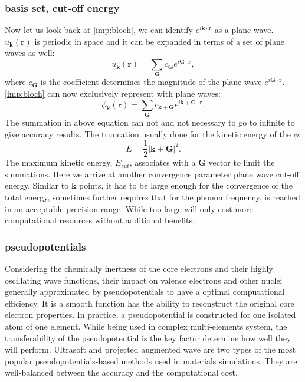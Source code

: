 \subsubsection{basis set, cut-off energy }
Now let us look back at \autoref{imp:bloch}, we can identify $e^{i\mathbf{k}\cdot\mathbf{r}}$ as a plane wave. $u_{\mathbf{k}}(\mathbf{r})$ is periodic in space and it can be expanded in terms of a set of plane waves as well:
\begin{equation}
u_{\mathbf{k}}(\mathbf{r})=\sum_{\mathbf{G}}c_{\mathbf{G}}e^{i\mathbf{G}\cdot\mathbf{r}},
\end{equation}
where $c_{\mathbf{G}}$ is the coefficient determines the magnitude of the plane wave $e^{i\mathbf{G}\cdot\mathbf{r}}$. \autoref{imp:bloch} can now exclusively represent with plane waves:
\begin{equation}
\phi_{\mathbf{k}}(\mathbf{r})=\sum_{\mathbf{G}}c_{\mathbf{k+G}}e^{i\mathbf{k+G}\cdot\mathbf{r}}.
\end{equation}
The summation in above equation can not and not necessary to go to infinite to give accuracy results. The truncation usually done for the kinetic energy of the $\phi$:
\begin{equation}
E=\frac{1}{2}|\mathbf{k+G}|^2.
\end{equation}
The maximum kinetic energy, $E_{cut}$, associates with a $\mathbf{G}$ vector to limit the summations. Here we arrive at another convergence parameter plane wave cut-off energy. Similar to $\mathbf{k}$ points, it has to be large enough for the convergence of the total energy, sometimes further requires that for the phonon frequency, is reached in an acceptable precision range.  While too large will only cost more computational resources without additional benefits.
\subsubsection{pseudopotentials}
Considering the chemically inertness of the core electrons and their highly oscillating wave functions, their impact on valence electrons and other nuclei generally approximated by pseudopotentials to have a optimal computational efficiency. It is a smooth function has the ability to reconstruct the original core electron properties. In practice, a pseudopotential is constructed for one isolated atom of one element. While being used in complex multi-elements system, the transferability of the pseudopotential is the key factor determine how well they will perform. Ultrasoft \cite{Vanderbilt1990} and projected augmented wave \cite{bloch1994,Kresse1999} are two types of the most popular pseudopotentials-based methods used in materials simulations. They are well-balanced between the accuracy and the computational cost. 
